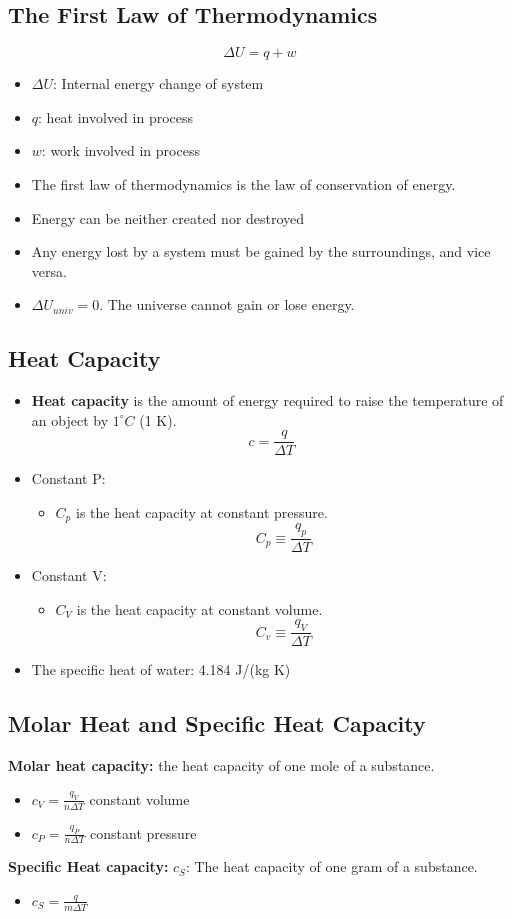 \documentclass[10pt]{article}
\begin{document}
\subsection*{The First Law of Thermodynamics}
\[\Delta U = q + w\]
\begin{itemize}
    \item $\Delta U$: Internal energy change of system
    \item $q$: heat involved in process
    \item $w$: work involved in process
    \item The first law of thermodynamics is the law of conservation of energy.
    \item Energy can be neither created nor destroyed
    \item Any energy lost by a system must be gained by the surroundings, and vice versa.
    \item $\Delta U_{univ} = 0$.  The universe cannot gain or lose energy.
\end{itemize}

\subsection*{Heat Capacity}
\begin{itemize}
    \item \textbf{Heat capacity} is the amount of energy required to raise the temperature of an object by $1^\circ C$ (1 K).
    \[c = \frac{q}{\Delta T}\]
    \item Constant P:
    \begin{itemize}
        \item $C_p$ is the heat capacity at constant pressure.
        \[C_p \equiv \frac{q_p}{\Delta T}\]
    \end{itemize}
    \item Constant V:
    \begin{itemize}
        \item $C_V$ is the heat capacity at constant volume.
        \[C_v \equiv \frac{q_V}{\Delta T}\]
    \end{itemize}
    \item The specific heat of water: 4.184 J/(kg K)
\end{itemize}

\subsection*{Molar Heat and Specific Heat Capacity}
\textbf{Molar heat capacity:} the heat capacity of one mole of a substance.
\begin{itemize}
    \item $c_V = \frac{q_V}{n \Delta T}$ constant volume
    \item $c_P = \frac{q_P}{n \Delta T}$ constant pressure
\end{itemize}
\textbf{Specific Heat capacity:} $c_S$: The heat capacity of one gram of a substance.
\begin{itemize}
    \item $c_S = \frac{q}{m \Delta T}$
\end{itemize}
\end{document}
